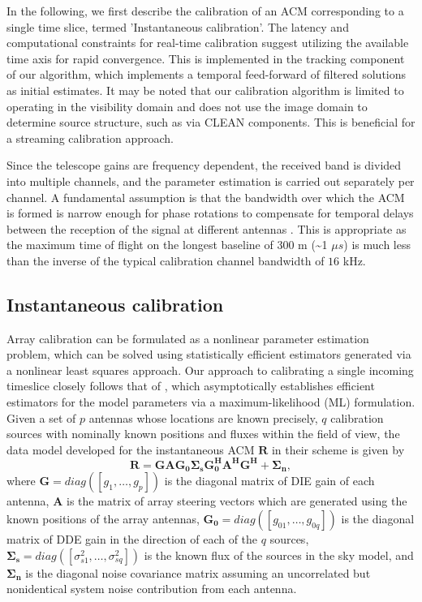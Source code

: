 \documentclass{aa}
\begin{document}
 In the  following,  we first  describe  the calibration  of an  ACM
corresponding to  a single  time slice, termed 'Instantaneous  calibration'.  The
latency  and   computational  constraints  for   real-time  calibration  suggest
utilizing the available time axis  for rapid convergence. This is implemented in
the  tracking   component  of  our   algorithm,  which  implements   a  temporal
feed-forward of filtered  solutions as initial estimates.  It  may be noted that
our calibration algorithm is limited  to operating in the visibility domain and
does not  use the image  domain to determine  source structure, such as  via CLEAN
components. This is beneficial for a streaming calibration approach.

Since  the telescope gains are frequency  dependent, the received band
is divided into  multiple channels, and the parameter  estimation is carried out
separately per  channel.  A  fundamental assumption is  that the  bandwidth over
which the ACM  is formed is narrow enough for phase  rotations to compensate for
temporal  delays between  the  reception  of the  signal  at different  antennas
\citep{zatman1998narrow}.  This is appropriate as  the maximum time of flight on
the longest baseline of 300 m  (\textasciitilde{}1 $\mu s$) is much less than
the  inverse of  the typical  calibration channel  bandwidth of  $16$  kHz.



\subsection{Instantaneous calibration}

Array  calibration  can  be  formulated  as a  nonlinear  parameter  estimation
problem, which can be  solved using statistically efficient estimators generated
via a  nonlinear least squares approach.  Our approach to  calibrating a single
incoming  timeslice closely  follows  that of  \citet{wijnholds2009multisource},
which asymptotically establishes efficient estimators for  the model parameters
via a  maximum-likelihood (ML)  formulation. Given a  set of $p$  antennas whose
locations are known  precisely,  $q$ calibration sources  with nominally known
positions and fluxes within the field  of view, the data model developed for the
instantaneous ACM $\mathbf{R}$ in their scheme is given by
\begin{equation}
\mathbf{R=GAG_{0}\Sigma_{s}G_{0}^{H}A^{H}G^{H}+\Sigma_{n},}\label{eq:datamodel}
\end{equation}
where    \textbf{$\mathbf{G=}diag(\left[g_{1},\ldots,g_{p}\right])$    }is   the
diagonal matrix of DIE gain of each antenna, $\mathbf{A}$ is the matrix of array
steering  vectors which are  generated using  the known  positions of  the array
antennas,    $\mathbf{G_{0}=}diag(\left[g_{01},\ldots,g_{0q}\right])$   is   the
diagonal  matrix of  DDE  gain in  the direction  of  each of  the $q$  sources,
$\mathbf{\Sigma_{s}}=diag\left(\left[\sigma_{s1}^{2},\ldots,\sigma_{sq}^{2}\right]\right)$
is the known flux of the  sources in the sky model, and $\mathbf{\Sigma_{n}}$ is
the diagonal noise covariance matrix assuming an uncorrelated but nonidentical
system noise contribution from each antenna.
\end{document}
